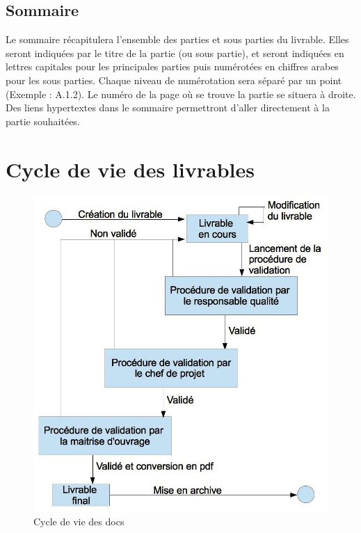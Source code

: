 \subsection{Sommaire}
    Le sommaire récapitulera l'ensemble des parties et sous parties du livrable. Elles seront indiquées par le titre de la partie (ou sous partie), et seront indiquées en lettres capitales pour les principales parties puis numérotées en chiffres arabes pour les sous parties. Chaque niveau de numérotation sera séparé par un point (Exemple : A.1.2). Le numéro de la page où se trouve la partie se situera à  droite. Des liens hypertextes dans le sommaire permettront d'aller directement à  la partie souhaitées.

\pagebreak
\section{Cycle de vie des livrables}

\begin{figure}[h]
    \centering
	\includegraphics[width=140mm]{images/cycle_de_vie_des_docs.jpg}
    \caption{Cycle de vie des docs}
\end{figure}

